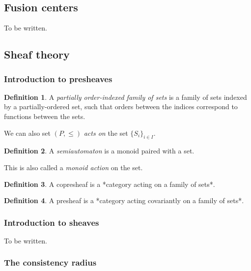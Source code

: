 \documentclass[]             %
{NASA}                       %
\theoremstyle{definition}
\newtheorem{definition}{Definition}[section]
\begin{document}
\hypertarget{fusion-centers}{%
\subsection{Fusion centers}\label{fusion-centers}}

To be written.

\hypertarget{sheaf-theory}{%
\subsection{Sheaf theory}\label{sheaf-theory}}

\hypertarget{introduction-to-presheaves}{%
\subsubsection{Introduction to
presheaves}\label{introduction-to-presheaves}}

\begin{definition}
A \emph{partially order-indexed family of sets} is a family of sets indexed by a partially-ordered set,
such that orders between the indices correspond to functions between the sets.
\end{definition}

We can also set \((P, \leq)\) \emph{acts on} the set
\(\{S_i\}_{i \in I}\).

\begin{definition}
A \emph{semiautomaton} is a monoid paired with a set.
\end{definition}

This is also called a \emph{monoid action} on the set.

\begin{definition}
A copresheaf is a *category acting on a family of sets*.
\end{definition}

\begin{definition}
A presheaf is a *category acting covariantly on a family of sets*.
\end{definition}

\hypertarget{introduction-to-sheaves}{%
\subsubsection{Introduction to sheaves}\label{introduction-to-sheaves}}

To be written.

\hypertarget{the-consistency-radius}{%
\subsubsection{The consistency radius}\label{the-consistency-radius}}
\end{document}
